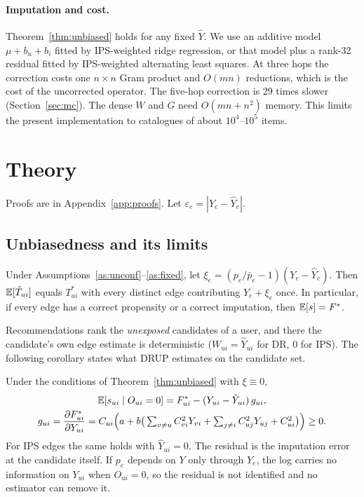 \paragraph{Imputation and cost.}
Theorem~\ref{thm:unbiased} holds for any fixed $\hat Y$. We use an additive model
$\mu+b_u+b_i$ fitted by IPS-weighted ridge regression, or that model plus a rank-32
residual fitted by IPS-weighted alternating least squares. At three hops the
correction costs one $n\times n$ Gram product and $O(mn)$ reductions, which is the cost of the
uncorrected operator. The five-hop correction is 29 times slower (Section~\ref{sec:mc}).
The dense $W$ and $G$ need $O(mn+n^2)$ memory. This limits the present implementation to
catalogues of about $10^4$--$10^5$ items.

\section{Theory}

Proofs are in Appendix~\ref{app:proofs}. Let $\varepsilon_e=|Y_e-\hat Y_e|$.

\subsection{Unbiasedness and its limits}

\begin{theorem}\label{thm:unbiased}
Under Assumptions~\ref{as:unconf}--\ref{as:fixed}, let
$\xi_e=(p_e/\bar p_e-1)(Y_e-\hat Y_e)$. Then $\mathbb{E}[\hat T_{ui}]$ equals $T^*_{ui}$
with every distinct edge contributing $Y_e+\xi_e$ once. In particular, if
every edge has a correct propensity or a correct imputation, then
$\mathbb{E}[s]=F^*$.
\end{theorem}

Recommendations rank the \emph{unexposed} candidates of a user, and there
the candidate's own edge estimate is deterministic ($W_{ui}=\hat Y_{ui}$ for DR,
$0$ for IPS). The following corollary states what DRUP estimates on the
candidate set.

\begin{corollary}\label{cor:cand}
Under the conditions of Theorem~\ref{thm:unbiased} with $\xi\equiv0$,
\begin{gather*}
\mathbb{E}[s_{ui}\mid O_{ui}=0]=F^*_{ui}-(Y_{ui}-\hat Y_{ui})\,g_{ui},\\
g_{ui}=\frac{\partial F^*_{ui}}{\partial Y_{ui}}
=C_{ui}\Big(a+b\big(\textstyle\sum_{v\neq u}C_{vi}^2Y_{vi}+\sum_{j\neq i}C_{uj}^2Y_{uj}+C_{ui}^2\big)\Big)\ge0 .
\end{gather*}
For IPS edges the same holds with $\hat Y_{ui}=0$. The residual is the
imputation error at the candidate itself. If $p_e$ depends on $Y$ only through
$Y_e$, the log carries no information on $Y_{ui}$ when $O_{ui}=0$, so the
residual is not identified and no estimator can remove it.
\end{corollary}

